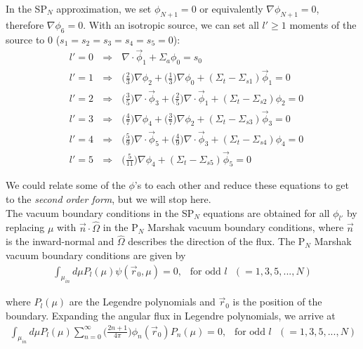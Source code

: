\documentclass[10pt]{article}
\begin{document}
In the SP$_N$ approximation, we set $\phi_{N+1}=0$ or equivalently $\nabla\phi_{N+1}=0$, therefore $\nabla \phi_6 = 0$. With an isotropic source, we can set all $l'\geq1$ moments of the source to 0 ($s_1= s_2=s_3=s_4=s_5=0$):
%
\begin{align*}
    &l'=0\ \ \ \Rightarrow\ \ \ \nabla \cdot \vec{\phi}_1 + \Sigma_a \phi_0 = s_0\\
    &l'=1\ \ \ \Rightarrow\ \ \ \Big(\frac{2}{3}\Big) \nabla\phi_{2} + \Big(\frac{1}{3}\Big)\nabla\phi_{0} + (\Sigma_t - \Sigma_{s1}) \vec{\phi}_{1} = 0\\
    &l'=2\ \ \ \Rightarrow\ \ \ \Big(\frac{3}{5}\Big) \nabla \cdot \vec{\phi}_{3} + \Big(\frac{2}{5}\Big)\nabla\cdot\vec{\phi}_{1} + (\Sigma_t - \Sigma_{s2}) \phi_{2} = 0 \\
    &l'=3\ \ \ \Rightarrow\ \ \ \Big(\frac{4}{7}\Big) \nabla\phi_{4} + \Big(\frac{3}{7}\Big)\nabla\phi_{2} + (\Sigma_t - \Sigma_{s3}) \vec{\phi}_{3} = 0 \\
    &l'=4\ \ \ \Rightarrow\ \ \ \Big(\frac{5}{9}\Big) \nabla \cdot \vec{\phi}_{5} + \Big(\frac{4}{9}\Big)\nabla\cdot\vec{\phi}_{3} + (\Sigma_t -\Sigma_{s4}) \phi_{4} = 0\\
    &l'=5\ \ \ \Rightarrow\ \ \ \Big(\frac{5}{11}\Big)\nabla\phi_{4} + (\Sigma_t-\Sigma_{s5}) \vec{\phi}_{5} = 0
\end{align*}

We could relate some of the $\phi$'s to each other and reduce these equations to get to the \emph{second order form}, but we will stop here.\\

The vacuum boundary conditions in the SP$_N$ equations are obtained for all $\phi_{l'}$ by replacing $\mu$ with $\vec{n} \cdot \hat{\Omega}$ in the P$_N$ Marshak vacuum boundary conditions, where $\vec{n}$ is the inward-normal and $\hat{\Omega}$ describes the direction of the flux. The P$_N$ Marshak vacuum boundary conditions are given by
%
\begin{align*}
    \int_{\mu_{in}} d\mu P_l(\mu)\psi(\vec{r}_0,\mu) = 0,\ \ \textrm{  for odd $l$ }(=1,3,5,...,N)
\end{align*}

where $P_l(\mu)$ are the Legendre polynomials and $\vec{r}_0$ is the position of the boundary. Expanding the angular flux in Legendre polynomials, we arrive at
%
\begin{align*}
    \int_{\mu_{in}} d\mu P_l(\mu)\sum_{n=0}^{\infty}\Big(\frac{2n+1}{4\pi}\Big) \phi_n(\vec{r}_0)P_n(\mu) = 0,\ \ \textrm{  for odd $l$ }(=1,3,5,...,N)
\end{align*}
\end{document}
